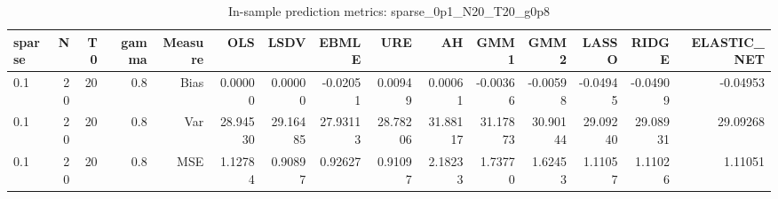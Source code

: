 \begin{table}[!htbp]\centering
\caption{In-sample prediction metrics: sparse_0p1_N20_T20_g0p8}
\label{tab:table2_sparse_0p1_N20_T20_g0p8}
\begin{tabular}{lrrrrrrrrrrrrrr}
\hline
sparse & N & T0 & gamma & Measure & OLS & LSDV & EBMLE & URE & AH & GMM1 & GMM2 & LASSO & RIDGE & ELASTIC_NET \\
\hline
0.1 & 20 & 20 & 0.8 & Bias & 0.00000 & 0.00000 & -0.02051 & 0.00949 & 0.00061 & -0.00366 & -0.00598 & -0.04945 & -0.04909 & -0.04953 \\
0.1 & 20 & 20 & 0.8 & Var & 28.94530 & 29.16485 & 27.93113 & 28.78206 & 31.88117 & 31.17873 & 30.90144 & 29.09240 & 29.08931 & 29.09268 \\
0.1 & 20 & 20 & 0.8 & MSE & 1.12784 & 0.90897 & 0.92627 & 0.91097 & 2.18233 & 1.73770 & 1.62453 & 1.11057 & 1.11026 & 1.11051 \\
\hline
\end{tabular}
\end{table}

